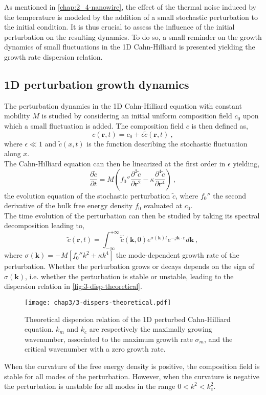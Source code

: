 As mentioned in \autoref{chap:2_4-nanowire}, the effect of the thermal noise induced by the temperature is modeled by the addition of a small stochastic perturbation to the initial condition. 
It is thus crucial to assess the influence of the initial perturbation on the resulting dynamics. To do so, a small reminder on the growth dynamics of small fluctuations in the 1D Cahn-Hilliard is presented yielding the growth rate dispersion relation. 
\subsection{1D perturbation growth dynamics}
The perturbation dynamics in the 1D Cahn-Hilliard equation with constant mobility $M$ is studied by considering an initial uniform composition field $c_0$ upon which a small fluctuation is added. The composition field $c$ is then defined as,
\begin{equation}
    c(\mathbf{r},t) = c_0 + \epsilon \tilde{c}(\mathbf{r}, t)\ ,
\end{equation}
where $\epsilon \ll 1$ and $\tilde{c}(x,t)$ is the function describing the stochastic fluctuation along $x$.\\
The Cahn-Hilliard equation can then be linearized at the first order in $\epsilon$ yielding,
\begin{equation}
    \frac{\partial \tilde{c}}{\partial t} = M\left(f_0''\frac{\partial^2 \tilde{c}}{\partial \mathbf{r}^2} - \kappa \frac{\partial^4 \tilde{c}}{\partial \mathbf{r}^4}\right)\ ,
\end{equation}
the evolution equation of the stochastic perturbation $\tilde{c}$, where $f_0''$ the second derivative of the bulk free energy density $f_0$ evaluated at $c_0$.\\
The time evolution of the perturbation can then be studied by taking its spectral decomposition leading to,
\begin{equation}
    \tilde{c}(\mathbf{r}, t) = \int_{-\infty}^{+\infty} \hat{\tilde{c}}(\mathbf{k}, 0) e^{\sigma(\mathbf{k}) t} e^{-j \mathbf{k} \cdot \mathbf{r}} d\mathbf{k}\ ,
\end{equation} 
where $\sigma(\mathbf{k})=-M\left[f_0''k^2+\kappa k^4\right]$ the mode-dependent growth rate of the perturbation. Whether the perturbation grows or decays depends on the sign of $\sigma(\mathbf{k})$, i.e. whether the perturbation is stable or unstable, leading to the dispersion relation in \autoref{fig:3-disp-theoretical}.
\begin{figure}[H]
    \centering
    \texttt{[image: chap3/3-dispers-theoretical.pdf]}
    \caption{Theoretical dispersion relation of the 1D perturbed Cahn-Hilliard equation. $k_m$ and $k_c$ are respectively the maximally growing wavenumber, associated to the maximum growth rate $\sigma_m$, and the critical wavenumber with a zero growth rate.}
    \label{fig:3-disp-theoretical}
\end{figure}
When the curvature of the free energy density is positive, the composition field is stable for all modes of the perturbation. However, when the curvature is negative the perturbation is unstable for all modes in the range $0 < k^2 < k_c^2$. 

